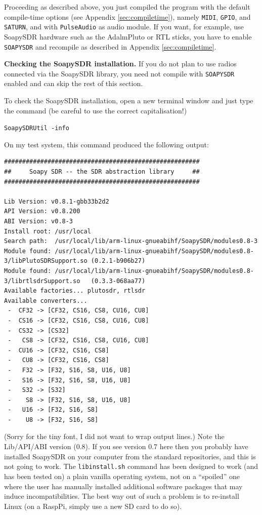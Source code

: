 \documentclass[12pt]{book}
\def\grtt#1{\texttt{\color{magenta}#1}}
\begin{document}
Proceeding as described above,  you  just compiled the program with
the default compile-time options (see Appendix \ref{sec:compiletime}), namely
\texttt{MIDI}, \texttt{GPIO}, and \texttt{SATURN}, and with \texttt{PulseAudio}
as audio module. If you want, for example, use SoapySDR hardware such as the AdalmPluto
or RTL sticks, you have to enable \texttt{SOAPYSDR} and recompile as described in
Appendix \ref{sec:compiletime}.

\bigskip

\textbf{\color{red}Checking the SoapySDR installation.}
If you do not plan to use radios connected via the SoapySDR library, you need not compile with \texttt{SOAPYSDR}
enabled and can skip the rest of this section.

To check the SoapySDR installation, open a new terminal
window and just type the command (be careful to use the correct capitalisation!)

\grtt{SoapySDRUtil -info}

On my test system, this command produced the following output:

\begin{tiny}
\begin{verbatim}
######################################################
##     Soapy SDR -- the SDR abstraction library     ##
######################################################

Lib Version: v0.8.1-gbb33b2d2
API Version: v0.8.200
ABI Version: v0.8-3
Install root: /usr/local
Search path:  /usr/local/lib/arm-linux-gnueabihf/SoapySDR/modules0.8-3
Module found: /usr/local/lib/arm-linux-gnueabihf/SoapySDR/modules0.8-3/libPlutoSDRSupport.so (0.2.1-b906b27)
Module found: /usr/local/lib/arm-linux-gnueabihf/SoapySDR/modules0.8-3/librtlsdrSupport.so   (0.3.3-068aa77)
Available factories... plutosdr, rtlsdr
Available converters...
 -  CF32 -> [CF32, CS16, CS8, CU16, CU8]
 -  CS16 -> [CF32, CS16, CS8, CU16, CU8]
 -  CS32 -> [CS32]
 -   CS8 -> [CF32, CS16, CS8, CU16, CU8]
 -  CU16 -> [CF32, CS16, CS8]
 -   CU8 -> [CF32, CS16, CS8]
 -   F32 -> [F32, S16, S8, U16, U8]
 -   S16 -> [F32, S16, S8, U16, U8]
 -   S32 -> [S32]
 -    S8 -> [F32, S16, S8, U16, U8]
 -   U16 -> [F32, S16, S8]
 -    U8 -> [F32, S16, S8]
\end{verbatim}
\end{tiny}

(Sorry for the tiny font, I did not want to wrap output lines.)
Note the Lib/API/ABI version (0.8). If you see version 0.7 here
then you probably have installed SoapySDR on your computer
from the standard repositories, and this is not going to work.
The \texttt{libinstall.sh} command  has been designed
to work (and has been tested on) a plain vanilla operating system, not on a ``spoiled'' one
where the user has manually installed additional software packages that may induce incompatibilities.
The best way out of such a problem is to re-install Linux (on a RaspPi, simply use a new SD card to do so).
\end{document}
